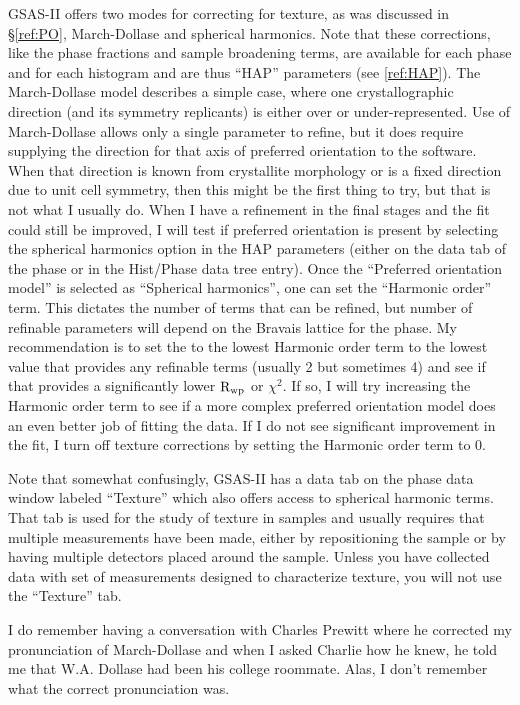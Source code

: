 GSAS-II offers two modes for correcting for texture, as was discussed in \S\ref{ref:PO}, March-Dollase and spherical harmonics. Note that these corrections, like the phase fractions and sample broadening terms, are available for each phase and for each histogram and are thus ``HAP'' parameters (see \ref{ref:HAP}). The March-Dollase model describes a simple case, where one crystallographic direction (and its symmetry replicants) is either over or under-represented. Use of March-Dollase allows only a single parameter to refine, but it does require supplying the direction for that axis of preferred orientation to the software. When that direction is known from crystallite morphology or is a fixed direction due to unit cell symmetry, then this might be the first thing to try, but that is not what I usually do. When I have a refinement in the final stages and the fit could still be improved, I will test if preferred orientation is present by selecting the spherical harmonics option in the HAP parameters (either on the data tab of the phase or in the Hist/Phase data tree entry). Once the ``Preferred orientation model'' is selected as ``Spherical harmonics'', one can set the ``Harmonic order'' term. This dictates the number of terms that can be refined, but number of refinable parameters will depend on the Bravais lattice for the phase. My recommendation is to set the  to the lowest Harmonic order term to the lowest value that provides any refinable terms (usually 2 but sometimes 4) and see if that provides a significantly lower $\rm R_{wp}$ or $\chi^2$. If so, I will try increasing the Harmonic order term to see if a more complex preferred orientation model does an even better job of fitting the data. If I do not see significant improvement in the fit, I turn off texture corrections by setting the Harmonic order term to 0.

Note that somewhat confusingly, GSAS-II has a data tab on the phase data window labeled ``Texture'' which also offers access to spherical harmonic terms. That tab is used for the study of texture in samples and usually requires that multiple measurements have been made, either by repositioning the sample or by having multiple detectors placed around the sample. Unless you have collected data with set of measurements designed to characterize texture, you will not use the ``Texture'' tab.

I do remember having a conversation with Charles Prewitt where he corrected my pronunciation of March-Dollase and when I asked Charlie how he knew, he told me that W.A. Dollase had been his college roommate. Alas, I don't remember what the correct pronunciation was.  

